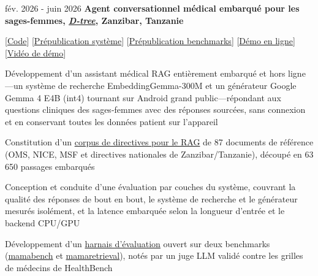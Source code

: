         \begin{twocolentry}{
            fév. 2026 - juin 2026
        }
            \textbf{Agent conversationnel médical embarqué pour les sages-femmes, \href{https://www.d-tree.org/}{\textit{D-tree}}, Zanzibar, Tanzanie}

            [\href{https://github.com/nmrenyi/mamai}{Code}] [\href{https://arxiv.org/abs/2606.29580}{Prépublication système}] [\href{https://arxiv.org/abs/2606.29467}{Prépublication benchmarks}] [\href{https://nmrenyi-mamai-demo.hf.space}{Démo en ligne}] [\href{https://youtu.be/M_Kruluel28}{Vidéo de démo}]
        \end{twocolentry}
        \vspace{0.10 cm}
        \begin{onecolentry}
            \begin{highlights}
                \item Développement d'un assistant médical RAG entièrement embarqué et hors ligne---un système de recherche EmbeddingGemma-300M et un générateur Google Gemma 4 E4B (int4) tournant sur Android grand public---répondant aux questions cliniques des sages-femmes avec des réponses sourcées, sans connexion et en conservant toutes les données patient sur l'appareil
                \item Constitution d'un \href{https://github.com/nmrenyi/mamai-medical-guidelines}{corpus de directives pour le RAG} de 87 documents de référence (OMS, NICE, MSF et directives nationales de Zanzibar/Tanzanie), découpé en 63 650 passages embarqués
                \item Conception et conduite d'une évaluation par couches du système, couvrant la qualité des réponses de bout en bout, le système de recherche et le générateur mesurés isolément, et la latence embarquée selon la longueur d'entrée et le backend CPU/GPU
                \item Développement d'un \href{https://github.com/nmrenyi/mamai-eval}{harnais d'évaluation} ouvert sur deux benchmarks (\href{https://huggingface.co/datasets/nmrenyi/mamabench}{mamabench} et \href{https://huggingface.co/datasets/nmrenyi/mamaretrieval}{mamaretrieval}), notés par un juge LLM validé contre les grilles de médecins de HealthBench
            \end{highlights}
        \end{onecolentry}



